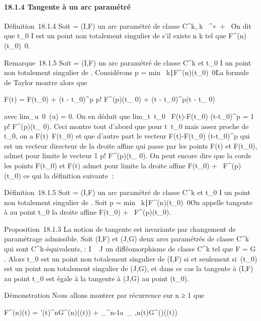 \documentclass[]{article}
\begin{document}
\paragraph{18.1.4 Tangente à un arc paramétré}

Définition~18.1.4 Soit \Gamma = (I,F) un arc paramétré de classe
C^k, k \in {}~^∗\cup\ +
\infty~\. On dit que t\_0 \in I est un point non
totalement singulier de \Gamma s'il existe n \leq k tel que
F^(n)(t\_0)\neq~0.

Remarque~18.1.5 Soit \Gamma = (I,F) un arc paramétré de classe C^k
et t\_0 \in I un point non totalement singulier de \Gamma. Considérons
p = min~\n \leq
k∣F^(n)(t\_0)\mathrel\neq~0\.
La formule de Taylor montre alors que

F(t) = F(t\_0) + (t - t\_0)^p
\over p! F^(p)(t\_ 0) + (t -
t\_0)^p\epsilon(t - t\_ 0)

avec lim\_u\rightarrow~0~\epsilon(u) = 0. On en déduit
que lim\_t\rightarrow~t\_0~
F(t)-F(t\_0) \over
(t-t\_0)^p = 1 \over p!
F^(p)(t\_ 0). Ceci montre tout d'abord que pour
t\neq~t\_0 mais assez proche de
t\_0, on a F(t)\neq~F(t\_0) et
que d'autre part le vecteur  F(t)-F(t\_0) \over
(t-t\_0)^p qui est un vecteur directeur de la
droite affine qui passe par les points F(t) et F(t\_0), admet
pour limite le vecteur  1 \over p!
F^(p)(t\_ 0). On peut encore dire que la corde
\jmathoignant les points F(t\_0) et F(t) admet pour limite la droite
affine F(t\_0) + ~F^(p)(t\_0) ce qui \jmathustifie
la définition suivante~:

Définition~18.1.5 Soit \Gamma = (I,F) un arc paramétré de classe
C^k et t\_0 \in I un point non totalement singulier de
\Gamma. Soit p = min~\n \leq
k∣F^(n)(t\_0)\mathrel\neq~0\.
On appelle tangente à \Gamma au point t\_0 la droite affine
F(t\_0) + ~F^(p)(t\_0).

Proposition~18.1.3 La notion de tangente est invariante par changement
de paramétrage admissible. Soit (I,F) et (J,G) deux arcs paramétrés de
classe C^k qui sont C^k-équivalents, \theta : I \rightarrow~ J un
difféomorphisme de classe C^k tel que F = G \cdot \theta. Alors
t\_0 est un point non totalement singulier de (I,F) si et
seulement si~\theta(t\_0) est un point non totalement singulier de
(J,G), et dans ce cas la tangente à (I,F) au point t\_0 est
égale à la tangente à (J,G) au point \theta(t\_0).

Démonstration Nous allons montrer par récurrence sur n ≥ 1 que

F^(n)(t) = \theta'(t)^nG^(n)(\theta(t)) +
\sum \_^n-1a~\_
\jmath,n(t)G^(\jmath)(\theta(t))
\end{document}
